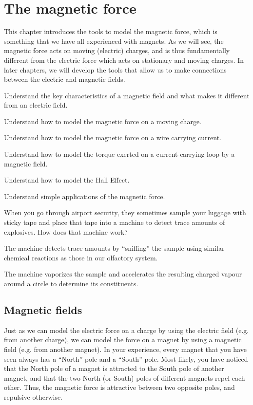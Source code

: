
\chapter{The magnetic force}
\label{chapter:magneticforce}
This chapter introduces the tools to model the magnetic force, which is something that we have all experienced with magnets. As we will see, the magnetic force acts on moving (electric) charges, and is thus fundamentally different from the electric force which acts on stationary and moving charges. In later chapters, we will develop the tools that allow us to make connections between the electric and magnetic fields.

\begin{learningObjectives}{
 \item Understand the key characteristics of a magnetic field and what makes it different from an electric field.
 \item Understand how to model the magnetic force on a moving charge.
 \item Understand how to model the magnetic force on a wire carrying current.
 \item Understand how to model the torque exerted on a current-carrying loop by a magnetic field.
 \item Understand how to model the Hall Effect.
 \item Understand simple applications of the magnetic force.
 }
\end{learningObjectives}

\begin{opening}
\begin{MCquestion}{When you go through airport security, they sometimes sample your luggage with sticky tape and place that tape into a machine to detect trace amounts of explosives. How does that machine work?}
\item The machine detects trace amounts by ``sniffing'' the sample using similar chemical reactions as those in our olfactory system.
\item The machine vaporizes the sample and accelerates the resulting charged vapour around a circle to determine its constituents. \correct
\end{MCquestion}
\end{opening}

\section{Magnetic fields}
Just as we can model the electric force on a charge by using the electric field (e.g. from another charge), we can model the force on a magnet by using a magnetic field (e.g. from another magnet). In your experience, every magnet that you have seen always has a ``North'' pole and a ``South'' pole. Most likely, you have noticed that the North pole of a magnet is attracted to the South pole of another magnet, and that the two North (or South) poles of different magnets repel each other. Thus, the magnetic force is attractive between two opposite poles, and repulsive otherwise.

